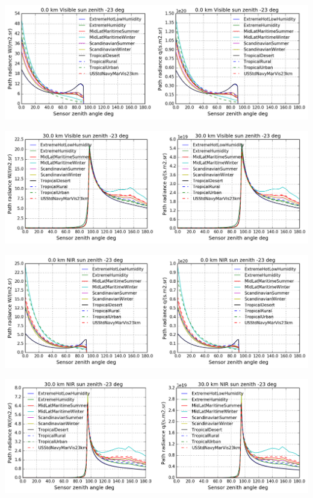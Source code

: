 \documentclass{workpackage}
\begin{document}
\begin{center}
\includegraphics{./pic/Analyse-Standard-Atmospheres_42_0.png}
\end{center}

\begin{center}
\includegraphics{./pic/Analyse-Standard-Atmospheres_42_1.png}
\end{center}

\begin{center}
\includegraphics{./pic/Analyse-Standard-Atmospheres_42_2.png}
\end{center}

\begin{center}
\includegraphics{./pic/Analyse-Standard-Atmospheres_42_3.png}
\end{center}
\end{document}
